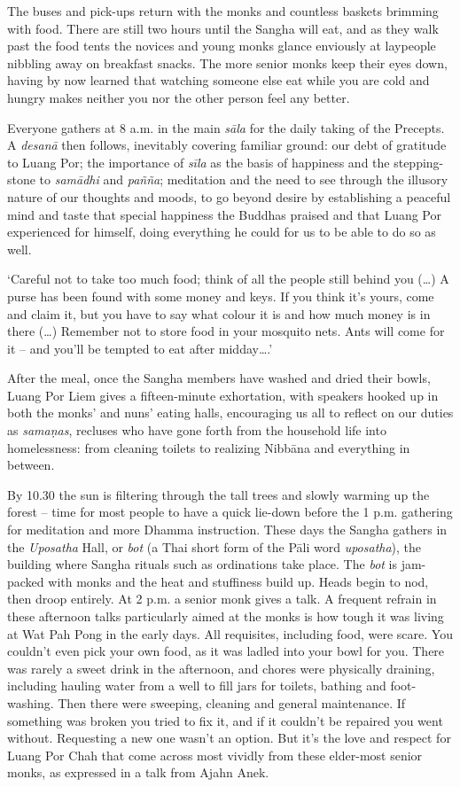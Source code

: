 The buses and pick-ups return with the monks and countless baskets
brimming with food. There are still two hours until the Sangha will eat, 
and as they walk past the food tents the novices and young monks glance
enviously at laypeople nibbling away on breakfast snacks. The more
senior monks keep their eyes down, having by now learned that watching
someone else eat while you are cold and hungry makes neither you nor the
other person feel any better. 

Everyone gathers at 8 a.m. in the main \emph{sāla} for the daily taking
of the Precepts. A \emph{desanā} then follows, inevitably covering
familiar ground: our debt of gratitude to Luang Por; the importance of
\emph{sīla} as the basis of happiness and the stepping-stone to
\emph{samādhi} and \emph{pañña}; meditation and the need to see through
the illusory nature of our thoughts and moods, to go beyond desire by
establishing a peaceful mind and taste that special happiness the
Buddhas praised and that Luang Por experienced for himself, doing
everything he could for us to be able to do so as well. 

`Careful not to take too much food; think of all the people still behind
you (\ldots{}) A purse has been found with some money and keys. If you
think it's yours, come and claim it, but you have to say what colour it
is and how much money is in there (\ldots{}) Remember not to store food
in your mosquito nets. Ants will come for it -- and you'll be tempted to
eat after midday\ldots{}.'

After the meal, once the Sangha members have washed and dried their
bowls, Luang Por Liem gives a fifteen-minute exhortation, with speakers
hooked up in both the monks' and nuns' eating halls, encouraging us all
to reflect on our duties as \emph{samaṇas}, recluses who have gone forth
from the household life into homelessness: from cleaning toilets to
realizing Nibbāna and everything in between. 

By 10.30 the sun is filtering through the tall trees and slowly warming
up the forest -- time for most people to have a quick lie-down before
the 1 p.m. gathering for meditation and more Dhamma instruction. These
days the Sangha gathers in the \emph{Uposatha} Hall, or \emph{bot} (a
Thai short form of the Pāli word \emph{uposatha}), the building where
Sangha rituals such as ordinations take place. The \emph{bot} is
jam-packed with monks and the heat and stuffiness build up. Heads begin
to nod, then droop entirely. At 2 p.m. a senior monk gives a talk. A
frequent refrain in these afternoon talks particularly aimed at the
monks is how tough it was living at Wat Pah Pong in the early days. All
requisites, including food, were scare. You couldn't even pick your own
food, as it was ladled into your bowl for you. There was rarely a sweet
drink in the afternoon, and chores were physically draining, including
hauling water from a well to fill jars for toilets, bathing and
foot-washing. Then there were sweeping, cleaning and general
maintenance. If something was broken you tried to fix it, and if it
couldn't be repaired you went without. Requesting a new one wasn't an
option. But it's the love and respect for Luang Por Chah that come
across most vividly from these elder-most senior monks, as expressed in
a talk from Ajahn Anek.

